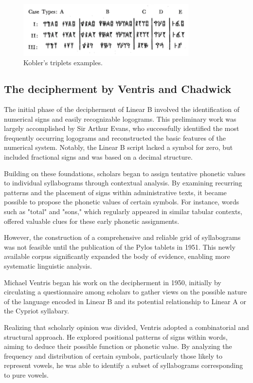 \begin{figure}[H]
\centering
\includegraphics[width=0.8\textwidth]{Images/kobler_triplets.png}
\caption{Kobler's triplets examples.}
\label{fig:kobler_triplets}
\end{figure}

\subsection{The decipherment by Ventris and Chadwick}
The initial phase of the decipherment of Linear B involved the identification of numerical signs and easily recognizable logograms.
This preliminary work was largely accomplished by Sir Arthur Evans, who successfully identified the most frequently occurring logograms and reconstructed the basic features of the numerical system.
Notably, the Linear B script lacked a symbol for zero, but included fractional signs and was based on a decimal structure.

Building on these foundations, scholars began to assign tentative phonetic values to individual syllabograms through contextual analysis.
By examining recurring patterns and the placement of signs within administrative texts, it became possible to propose the phonetic values of certain symbols.
For instance, words such as "total" and "sons," which regularly appeared in similar tabular contexts, offered valuable clues for these early phonetic assignments.

However, the construction of a comprehensive and reliable grid of syllabograms was not feasible until the publication of the Pylos tablets in 1951.
This newly available corpus significantly expanded the body of evidence, enabling more systematic linguistic analysis.

Michael Ventris began his work on the decipherment in 1950, initially by circulating a questionnaire among scholars to gather views on the possible nature of the language encoded in Linear B and its potential relationship to Linear A or the Cypriot syllabary.

Realizing that scholarly opinion was divided, Ventris adopted a combinatorial and structural approach.
He explored positional patterns of signs within words, aiming to deduce their possible function or phonetic value.
By analyzing the frequency and distribution of certain symbols, particularly those likely to represent vowels, he was able to identify a subset of syllabograms corresponding to pure vowels.

